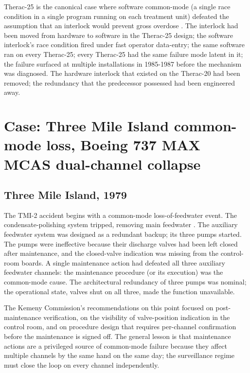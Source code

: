 Therac-25 is the canonical case where software common-mode (a single race condition in a single program running on each treatment unit) defeated the assumption that an interlock would prevent gross overdose \cite{paper:leveson-turner1993}. The interlock had been moved from hardware to software in the Therac-25 design; the software interlock's race condition fired under fast operator data-entry; the same software ran on every Therac-25; every Therac-25 had the same failure mode latent in it; the failure surfaced at multiple installations in 1985-1987 before the mechanism was diagnosed. The hardware interlock that existed on the Therac-20 had been removed; the redundancy that the predecessor possessed had been engineered away.

\section{Case: Three Mile Island common-mode loss, Boeing 737 MAX MCAS dual-channel collapse}

\subsection*{Three Mile Island, 1979}

The TMI-2 accident begins with a common-mode loss-of-feedwater event. The condensate-polishing system tripped, removing main feedwater \cite{acc:kemeny-tmi-1979}. The auxiliary feedwater system was designed as a redundant backup; its three pumps started. The pumps were ineffective because their discharge valves had been left closed after maintenance, and the closed-valve indication was missing from the control-room boards. A single maintenance action had defeated all three auxiliary feedwater channels: the maintenance procedure (or its execution) was the common-mode cause. The architectural redundancy of three pumps was nominal; the operational state, valves shut on all three, made the function unavailable.

The Kemeny Commission's recommendations on this point focused on post-maintenance verification, on the visibility of valve-position indication in the control room, and on procedure design that requires per-channel confirmation before the maintenance is signed off. The general lesson is that maintenance actions are a privileged source of common-mode failure because they affect multiple channels by the same hand on the same day; the surveillance regime must close the loop on every channel independently.

